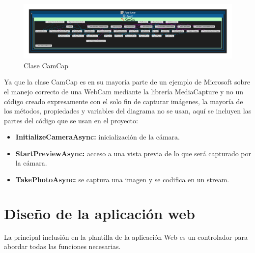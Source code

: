\begin{figure}[!htbp]
	\centering
	\includegraphics[angle=90, scale=0.9]{fig/CamCap}
	\caption{Clase CamCap}
\end{figure}

Ya que la clase CamCap es en su mayoría parte de un ejemplo de Microsoft sobre el manejo correcto de una WebCam mediante la librería MediaCapture y no un código creado expresamente con el solo fin de capturar imágenes, la mayoría de los métodos, propiedades y variables del diagrama no se usan, aquí se incluyen las partes del código que se usan en el proyecto:

\begin{itemize}

\item \textbf{InitializeCameraAsync:} inicialización de la cámara.



\item \textbf{StartPreviewAsync:} acceso a una vista previa de lo que será capturado por la cámara.



\item \textbf{TakePhotoAsync:} se captura una imagen y se codifica en un stream.



\end{itemize}

\section{Diseño de la aplicación web}

La principal inclusión en la plantilla de la aplicación Web es un controlador para abordar todas las funciones necesarias.

